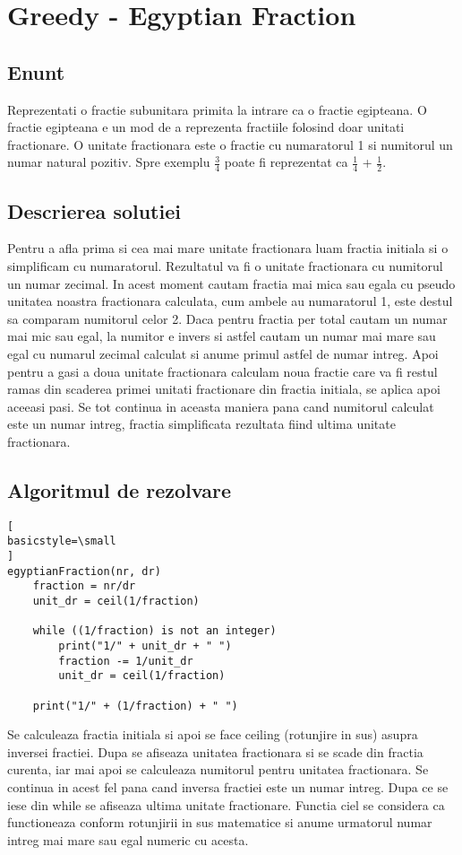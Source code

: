 \documentclass[runningheads]{llncs}
\begin{document}
\section{Greedy - Egyptian Fraction}
\subsection{Enunt}
Reprezentati o fractie subunitara primita la intrare ca o fractie egipteana. O fractie egipteana e un mod de a reprezenta fractiile folosind doar
unitati fractionare. O unitate fractionara este o fractie cu numaratorul 1 si numitorul un numar natural pozitiv. Spre exemplu
$\frac{3}{4}$ poate fi reprezentat ca $\frac{1}{4}$ + $\frac{1}{2}$.
\subsection{Descrierea solutiei}
Pentru a afla prima si cea mai mare unitate fractionara luam fractia initiala si o simplificam cu numaratorul. Rezultatul va fi o unitate fractionara
cu numitorul un numar zecimal. In acest moment cautam fractia mai mica sau egala cu pseudo unitatea noastra fractionara calculata, cum ambele
au numaratorul 1, este destul sa comparam numitorul celor 2. Daca pentru fractia per total cautam un numar mai mic sau egal, la numitor e invers si astfel
cautam un numar mai mare sau egal cu numarul zecimal calculat si anume primul astfel de numar intreg. Apoi pentru a gasi a doua unitate fractionara
calculam noua fractie care va fi restul ramas din scaderea primei unitati fractionare din fractia initiala, se aplica apoi aceeasi pasi. Se tot continua
in aceasta maniera pana cand numitorul calculat este un numar intreg, fractia simplificata rezultata fiind ultima unitate fractionara.
\subsection{Algoritmul de rezolvare}
\begin{lstlisting}[
basicstyle=\small
]
egyptianFraction(nr, dr)
	fraction = nr/dr
	unit_dr = ceil(1/fraction)
	
	while ((1/fraction) is not an integer)
		print("1/" + unit_dr + " ")
		fraction -= 1/unit_dr
		unit_dr = ceil(1/fraction)
	
	print("1/" + (1/fraction) + " ")
\end{lstlisting}
\vspace*{1em}
Se calculeaza fractia initiala si apoi se face ceiling (rotunjire in sus) asupra inversei fractiei. Dupa se afiseaza unitatea fractionara si
se scade din fractia curenta, iar mai apoi se calculeaza numitorul pentru unitatea fractionara. Se continua in acest fel pana cand
inversa fractiei este un numar intreg. Dupa ce se iese din while se afiseaza ultima unitate fractionare. Functia ciel se considera ca
functioneaza conform rotunjirii in sus matematice si anume urmatorul numar intreg mai mare sau egal numeric cu acesta.
\end{document}
